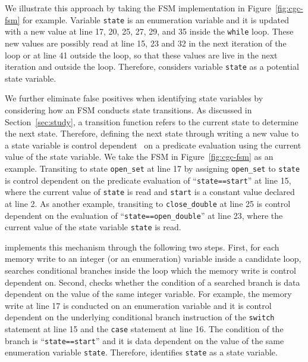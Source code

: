We illustrate this approach by taking the FSM implementation
in Figure~\ref{fig:cgc-fsm} for example. 
Variable \texttt{state} is an enumeration variable and it is updated 
with a new value at 
line 17, 20, 25, 27, 29, and 35 inside the \texttt{while} loop. 
These new values are possibly read at line 15, 23 and 32 
in the next iteration of the loop or at line 41 outside the loop, 
so that these values are live in the next iteration and outside the loop. 
Therefore, \Tool{} considers variable \texttt{state} as a potential 
state variable.  



We further eliminate false positives when identifying state variables 
by considering how an FSM conducts state transitions. 
As discussed in Section~\ref{sec:study}, 
a transition function refers to the current state to determine the next state. 
Therefore, defining the next state through writing a new value to a state variable 
is control dependent~\cite{cdg} on a predicate evaluation 
using the current value of the state variable.  
We take the FSM in Figure~\ref{fig:cgc-fsm} as an example.
Transiting to state \texttt{open\_set} at line 17 by assigning 
\texttt{open\_set} to \texttt{state} 
is control dependent on the predicate evaluation 
of ``\texttt{state==start}'' at line 15,
where the current value of \texttt{state} is read 
and \texttt{start} is a constant value declared at line 2. 
As another example, transiting to \texttt{close\_double} at 
line 25 is control dependent on the 
evaluation of ``\texttt{state==open\_double}'' at line 23, 
where the current value of the state variable \texttt{state} is read. 



\Tool{} implements this mechanism through the following two steps. 
First, for each memory write to an integer (or an enumeration) 
variable inside a candidate loop, 
\Tool{} searches conditional branches inside the loop 
which the memory write is control dependent on. 
Second, \Tool{} checks whether the condition of a searched branch 
is data dependent on the value of the same integer variable. 
For example, the memory write at line 17 is conducted on an enumeration variable
and it is control dependent on the underlying conditional branch 
instruction of 
the \texttt{switch} statement at line 15 and the \texttt{case} statement at line 16.  
The condition of the branch is ``\texttt{state==start}'' and it is 
data dependent on the value of the same enumeration variable \texttt{state}. 
Therefore, \Tool{} identifies \texttt{state} as a state variable. 

